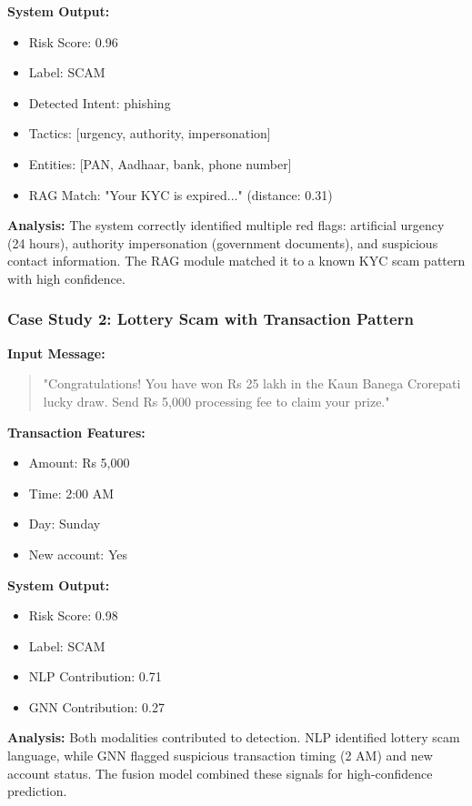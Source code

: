 \textbf{System Output:}
\begin{itemize}
    \item Risk Score: 0.96
    \item Label: SCAM
    \item Detected Intent: phishing
    \item Tactics: [urgency, authority, impersonation]
    \item Entities: [PAN, Aadhaar, bank, phone number]
    \item RAG Match: "Your KYC is expired..." (distance: 0.31)
\end{itemize}

\textbf{Analysis:}
The system correctly identified multiple red flags: artificial urgency (24 hours), authority impersonation (government documents), and suspicious contact information. The RAG module matched it to a known KYC scam pattern with high confidence.

\subsubsection{Case Study 2: Lottery Scam with Transaction Pattern}

\textbf{Input Message:}
\begin{quote}
"Congratulations! You have won Rs 25 lakh in the Kaun Banega Crorepati lucky draw. Send Rs 5,000 processing fee to claim your prize."
\end{quote}

\textbf{Transaction Features:}
\begin{itemize}
    \item Amount: Rs 5,000
    \item Time: 2:00 AM
    \item Day: Sunday
    \item New account: Yes
\end{itemize}

\textbf{System Output:}
\begin{itemize}
    \item Risk Score: 0.98
    \item Label: SCAM
    \item NLP Contribution: 0.71
    \item GNN Contribution: 0.27
\end{itemize}

\textbf{Analysis:}
Both modalities contributed to detection. NLP identified lottery scam language, while GNN flagged suspicious transaction timing (2 AM) and new account status. The fusion model combined these signals for high-confidence prediction.

